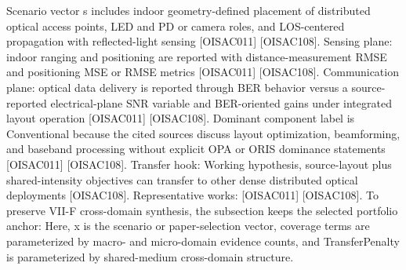 {}Scenario vector s includes indoor geometry-defined placement of distributed optical access points, LED and PD or camera roles, and LOS-centered propagation with reflected-light sensing [O\markdownRendererUnderscore{}ISAC\markdownRendererUnderscore{}011] [O\markdownRendererUnderscore{}ISAC\markdownRendererUnderscore{}108]. Sensing plane: indoor ranging and positioning are reported with distance-measurement RMSE and positioning MSE or RMSE metrics [O\markdownRendererUnderscore{}ISAC\markdownRendererUnderscore{}011] [O\markdownRendererUnderscore{}ISAC\markdownRendererUnderscore{}108]. Communication plane: optical data delivery is reported through BER behavior versus a source-reported electrical-plane SNR variable and BER-oriented gains under integrated layout operation [O\markdownRendererUnderscore{}ISAC\markdownRendererUnderscore{}011] [O\markdownRendererUnderscore{}ISAC\markdownRendererUnderscore{}108]. Dominant component label is Conventional because the cited sources discuss layout optimization, beamforming, and baseband processing without explicit OPA or ORIS dominance statements [O\markdownRendererUnderscore{}ISAC\markdownRendererUnderscore{}011] [O\markdownRendererUnderscore{}ISAC\markdownRendererUnderscore{}108]. Transfer hook: Working hypothesis, source-layout plus shared-intensity objectives can transfer to other dense distributed optical deployments [O\markdownRendererUnderscore{}ISAC\markdownRendererUnderscore{}108]. Representative works: [O\markdownRendererUnderscore{}ISAC\markdownRendererUnderscore{}011] [O\markdownRendererUnderscore{}ISAC\markdownRendererUnderscore{}108].\markdownRendererInterblockSeparator
{}
\markdownRendererSectionEnd \markdownRendererSectionBegin
{}\markdownRendererInterblockSeparator
{}To preserve VII-F cross-domain synthesis, the subsection keeps the selected portfolio anchor:\markdownRendererParagraphSeparator
{}\markdownRendererSoftLineBreak
{}\markdownRendererSoftLineBreak
{}\markdownRendererParagraphSeparator
{}Here, x is the scenario or paper-selection vector, coverage terms are parameterized by macro- and micro-domain evidence counts, and TransferPenalty is parameterized by shared-medium cross-domain structure.\markdownRendererParagraphSeparator
